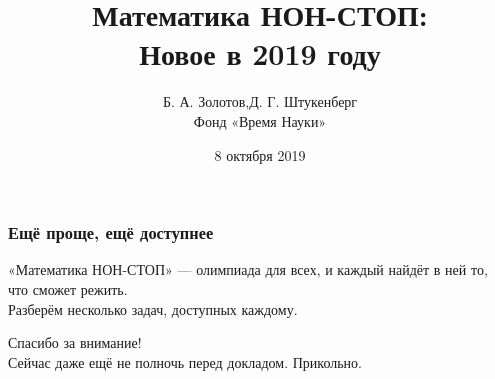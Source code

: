 \documentclass[aspectratio=1610,12pt,notheorems]{beamer}
\title[Mathnonstop 2019: the seminar]
    {\bfseries Математика НОН-СТОП: \\
	Новое в 2019 году}
\author[\ ]
	{Б. А. Золотов,\qquad Д. Г. Штукенберг \\ \vspace{0.3cm}
		{\small Фонд «Время Науки»}}
\institute[\ ]{\ }
\date{8 октября 2019}
\theoremstyle{plain}
\theoremstyle{definition}
\def\ps{\\ [0.65cm]} \linespread{1.16}
\begin{document}
\frame{\titlepage}




\begin{frame}
\frametitle{Ещё проще, ещё доступнее}
	«Математика НОН-СТОП» — олимпиада для всех, и каждый найдёт в ней то, что сможет режить. \ps

	Разберём несколько задач, доступных каждому.
\end{frame}

\begin{frame} \begin{center}
	\Huge{Спасибо за внимание!} \ps
	\small{Сейчас даже ещё не полночь перед докладом. Прикольно.}
\end{center} \end{frame}
\end{document}
